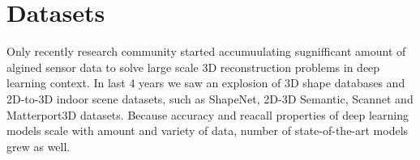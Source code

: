 \section{Datasets}

Only recently research community started accumuulating sugnifficant amount of algined sensor data to solve large scale 3D reconstruction problems in deep learning context. In last 4 years we saw an explosion of 3D shape databases and 2D-to-3D indoor scene datasets, such as ShapeNet, 2D-3D Semantic, Scannet and Matterport3D datasets. Because accuracy and reacall properties of deep learning models scale with amount and variety of data, number of state-of-the-art models grew as well.
